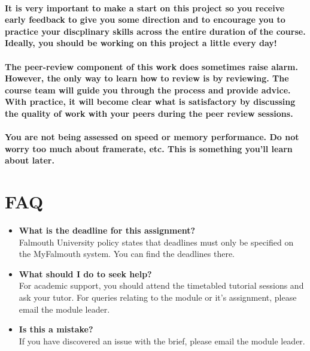 \documentclass{../../fal_assignment}
\begin{document}
\paragraph{It is very important to make a start on this project so you receive early feedback to give you some direction and to encourage you to practice your discplinary skills across the entire duration of the course. Ideally, you should be working on this project a little every day!}

\paragraph{The peer-review component of this work does sometimes raise alarm. However, the only way to learn how to review is by reviewing. The course team will guide you through the process and provide advice. With practice, it will become clear what is satisfactory by discussing the quality of work with your peers during the peer review sessions.} 

\paragraph{You are not being assessed on speed or memory performance. Do not worry too much about framerate, etc. This is something you'll learn about later.}

\section*{FAQ}

\begin{itemize}
	\item 	\textbf{What is the deadline for this assignment?} \\ 
    		Falmouth University policy states that deadlines must only be specified on the MyFalmouth system. You can find the deadlines there.
    		
	\item 	\textbf{What should I do to seek help?} \\ 
    		For academic support, you should attend the timetabled tutorial sessions and ask your tutor. For queries relating to the module or it's assignment, please email the module leader.
    		
    	\item 	\textbf{Is this a mistake?} \\ 	
    		If you have discovered an issue with the brief, please email the module leader.
\end{itemize}
\end{document}
